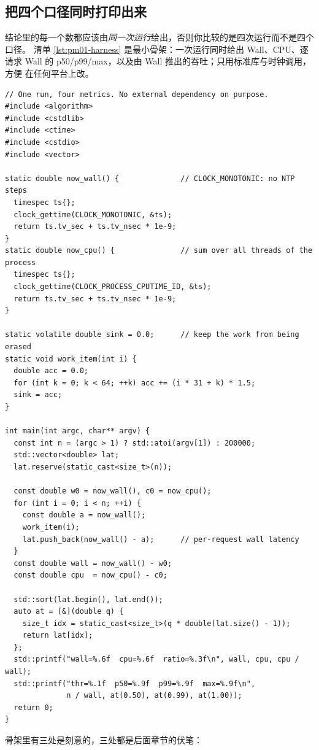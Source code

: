 \documentclass[12pt,a4paper,fontset=fandol]{ctexbook}
\newcommand{\Lang}[1]{\textsf{#1}}
\newcommand{\MWall}{\Lang{Wall}}
\newcommand{\MCpu}{\Lang{CPU}}
\newcommand{\Mx}[1]{\textsf{#1}}
\begin{document}
\subsection{把四个口径同时打印出来}
\label{sub:pm01-harness}

结论里的每一个数都应该由\emph{同一次运行}给出，否则你比较的是四次运行而不是四个口径。
清单 \ref{lst:pm01-harness} 是最小骨架：一次运行同时给出 \MWall、\MCpu、逐请求 \MWall{}
的 \Mx{p50}/\Mx{p99}/\Mx{max}，以及由 \MWall{} 推出的吞吐；只用标准库与时钟调用，方便
在任何平台上改。

\begin{lstlisting}[style=cppstyle,caption={四个口径同源于一次运行的最小测量骨架
（占位工作函数请换成你自己的被测代码）},label={lst:pm01-harness}]
// One run, four metrics. No external dependency on purpose.
#include <algorithm>
#include <cstdlib>
#include <ctime>
#include <cstdio>
#include <vector>

static double now_wall() {              // CLOCK_MONOTONIC: no NTP steps
  timespec ts{};
  clock_gettime(CLOCK_MONOTONIC, &ts);
  return ts.tv_sec + ts.tv_nsec * 1e-9;
}
static double now_cpu() {               // sum over all threads of the process
  timespec ts{};
  clock_gettime(CLOCK_PROCESS_CPUTIME_ID, &ts);
  return ts.tv_sec + ts.tv_nsec * 1e-9;
}

static volatile double sink = 0.0;      // keep the work from being erased
static void work_item(int i) {
  double acc = 0.0;
  for (int k = 0; k < 64; ++k) acc += (i * 31 + k) * 1.5;
  sink = acc;
}

int main(int argc, char** argv) {
  const int n = (argc > 1) ? std::atoi(argv[1]) : 200000;
  std::vector<double> lat;
  lat.reserve(static_cast<size_t>(n));

  const double w0 = now_wall(), c0 = now_cpu();
  for (int i = 0; i < n; ++i) {
    const double a = now_wall();
    work_item(i);
    lat.push_back(now_wall() - a);      // per-request wall latency
  }
  const double wall = now_wall() - w0;
  const double cpu  = now_cpu() - c0;

  std::sort(lat.begin(), lat.end());
  auto at = [&](double q) {
    size_t idx = static_cast<size_t>(q * double(lat.size() - 1));
    return lat[idx];
  };
  std::printf("wall=%.6f  cpu=%.6f  ratio=%.3f\n", wall, cpu, cpu / wall);
  std::printf("thr=%.1f  p50=%.9f  p99=%.9f  max=%.9f\n",
              n / wall, at(0.50), at(0.99), at(1.00));
  return 0;
}
\end{lstlisting}

骨架里有三处是刻意的，三处都是后面章节的伏笔：
\end{document}
